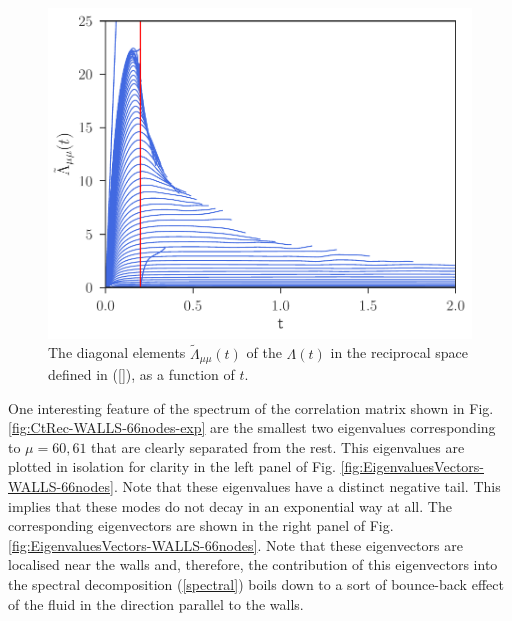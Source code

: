 \documentclass[b5paper,openright,11pt]{book}
\begin{document}
\begin{figure}[h!]
  \centering
\includegraphics[scale=0.41]{LambdatRec-WALLS-66nodes}
\caption[Diagonal elements  $\tilde{\Lambda}_{\mu\mu}(t)$ of $\Lambda(t)$ in the reciprocal space - 66nodes.]{The  diagonal elements  $\tilde{\Lambda}_{\mu\mu}(t)$ of  the
  $\Lambda(t)$ in the reciprocal space defined in (\ref{}), as a
  function of $t$.}
\label{fig:LambdatRec-WALLS-66nodes}
\end{figure}

One  interesting feature  of the  spectrum of  the correlation  matrix
shown  in  Fig.  \ref{fig:CtRec-WALLS-66nodes-exp}  are  the  smallest two  eigenvalues
corresponding to $\mu=60,61$  that are clearly separated from the rest.
This eigenvalues are plotted in isolation for clarity in the left panel
of  Fig.  \ref{fig:EigenvaluesVectors-WALLS-66nodes}.   Note that  these eigenvalues  have a
distinct negative tail. This implies that  these modes do not decay in
an exponential way at all. The corresponding eigenvectors are shown in
the  right  panel of  Fig.   \ref{fig:EigenvaluesVectors-WALLS-66nodes}.   Note that  these
eigenvectors  are  localised  near   the  walls  and,  therefore,  the
contribution  of this  eigenvectors  into  the spectral  decomposition
(\ref{spectral}) boils  down to  a sort of  bounce-back effect  of the
fluid in the direction parallel to the walls.
\end{document}
